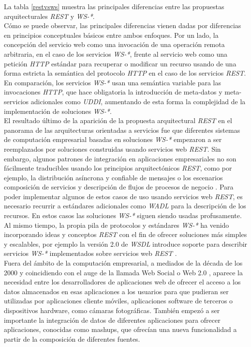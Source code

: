 La tabla \ref{restvsws} muestra las principales diferencias entre las propuestas arquitecturales \textit{REST} y \textit{WS-*}.\\
C\'omo se puede observar, las principales diferencias vienen dadas por diferencias en principios conceptuales b\'asicos entre ambos enfoques. Por un lado, la concepci\'on del servicio web como una invocaci\'on de una operaci\'on remota arbitraria, en el caso de los servicios \textit{WS-*}, frente al servicio web como una petici\'on \textit{HTTP} est\'andar para recuperar o modificar un recurso usando de una forma estricta la sem\'antica del protocolo \textit{HTTP} en el caso de los servicios \textit{REST}. En comparaci\'on, los servicios \textit{WS-*} usan una sem\'antica variable para las invocaciones \textit{HTTP}, que hace obligatoria la introducci\'on de meta-datos y meta-servicios adicionales como \textit{UDDI}, aumentando de esta forma la complejidad de la implementaci\'on de soluciones \textit{WS-*}.\\
El resultado \'ultimo de la aparici\'on de la propuesta arquitectural \textit{REST} en el panorama de las arquitecturas orientadas a servicios fue que diferentes sistemas de computaci\'on empresarial basadas en soluciones \textit{WS-*} empezaron a ser reemplazados por soluciones construidas usando servicios web \textit{REST}. Sin embargo, algunos patrones de integraci\'on en aplicaciones empresariales no son f\'acilmente traducibles usando los principios arquitect\'onicos \textit{REST}, como por ejemplo, la distribuci\'on as\'incrona y confiable de mensajes o los escenarios composici\'on de servicios y descripci\'on de flujos de procesos de negocio \cite{pautasso2008restful}. Para poder implementar algunos de estos casos de uso usando servicios web \textit{REST}, es necesario recurrir a est\'andares adicionales como \textit{WADL} \cite{wadl} para la descripci\'on de los recursos. En estos casos las soluciones \textit{WS-*} siguen siendo usadas profusamente.\\
Al mismo tiempo, la propia pila de protocolos y est\'andares \textit{WS-*} ha venido incorporando ideas y conceptos \textit{REST} con el fin de ofrecer soluciones m\'as simples y escalables, por ejemplo la versi\'on 2.0 de \textit{WSDL} introduce soporte para describir servicios \textit{WS-*} implementados sobre servicios web \textit{REST} \cite{takase2008definition}.\\
Fuera del \'ambito de la computaci\'on empresarial, a mediados de la d\'ecada de los 2000 y coincidiendo con el auge de la llamada Web Social o Web 2.0 \cite{murugesan2007understanding}, aparece la necesidad entre los desarrolladores de aplicaciones web de ofrecer el acceso a los datos almacenados en esas aplicaciones a los usuarios para que pudieran ser utilizadas por aplicaciones cliente m\'oviles, aplicaciones software de terceros o dispositivos hardware, como c\'amaras fotogr\'aficas. Tambi\'en empez\'o a ser importante la integraci\'on de datos de diferentes aplicaciones para ofrecer aplicaciones, conocidas como mashups, que ofrec\'ian una nueva funcionalidad a partir de la composici\'on de diferentes fuentes.\\
